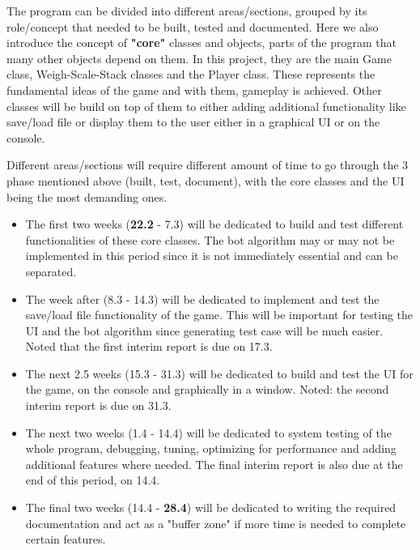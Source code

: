 \documentclass[12pt]{article}
\begin{document}
The program can be divided into different areas/sections, grouped by its
role/concept that needed to be built, tested and documented. Here we also
introduce the concept of \textbf{"core"} classes and objects, parts of the
program that many other objects depend on them. In this project, they are the
main Game class, Weigh-Scale-Stack classes and the Player class. These
represents the fundamental ideas of the game and with them, gameplay is
achieved. Other classes will be build on top of them to either adding additional
functionality like save/load file or display them to the user either in a
graphical UI or on the console.

Different areas/sections will require different amount of time to go through the
3 phase mentioned above (built, test, document), with the core classes and the
UI being the most demanding ones. 

\begin{itemize}
  \item  The first two weeks (\textbf{22.2} - 7.3) will be dedicated to build
    and test different functionalities of these core classes. The bot algorithm
    may or may not be implemented in this period since it is not immediately
    essential and can be separated.
  \item The week after (8.3 - 14.3) will be dedicated to implement and test the
    save/load file functionality of the game. This will be important for testing
    the UI and the bot algorithm since generating test case will be much easier.
    Noted that the first interim report is due on 17.3.
  \item  The next 2.5 weeks (15.3 - 31.3) will be dedicated to build and test
    the UI for the game, on the console and graphically in a window. Noted: the
    second interim report is due on 31.3.
  \item  The next two weeks (1.4 -  14.4) will be dedicated to system testing of
    the whole program, debugging, tuning, optimizing for performance and adding
    additional features where needed. The final interim report is also due at
    the end of this period, on 14.4.
  \item  The final two weeks (14.4 - \textbf{28.4}) will be dedicated to writing
    the required documentation and act as a "buffer zone" if more time is needed
    to complete certain features.
\end{itemize}

\nocite{nystrom2014game}
\nocite{scalacollection}


\end{document}
